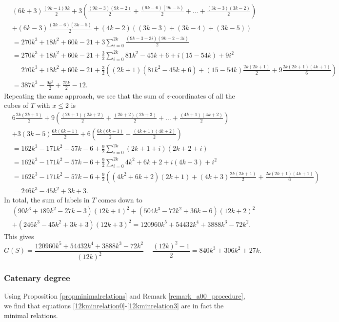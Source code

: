 \documentclass[12pt]{article}
\theoremstyle{remark}
\begin{document}
\begin{align*}
&(6k+3)\frac{(9k-1)9k}{2}   + 3 \left( \frac{(9k-3)(9k-2)}{2}  +  \frac{(9k-6)(9k-5)}{2}  + \dots +   \frac{(3k-3)(3k-2)}{2} \right) \\
& + (6k-3) \frac{(3k-6)(3k-5)}{2}   + (4k-2)( (3k-3) +(3k-4) + (3k-5))\\
& = 270 k^3 + 18 k^2 + 60 k - 21 + 3\sum_{i=0}^{2k} \frac{(9k-3-3i)(9k-2-3i)}{2} \\
& = 270 k^3 + 18 k^2 + 60 k - 21 + \frac{3}{2}\sum_{i=0}^{2k} 81k^2 - 45k+6 + i(15-54k) + 9i^2  \\
&= 270 k^3 + 18 k^2 + 60 k - 21 
+ \frac{3}{2}\left(  (2k+1)(81k^2 - 45k+6) + (15-54k)\frac{2k(2k+1)}{2} + 9 \frac{2k(2k+1)(4k+1)}{6} \right) \\
& = 387 k^3 - \frac{9 k^2}{2} + \frac{75 k}{2} - 12.
\end{align*} \small
Repeating the same approach, we see that the sum of $z$-coordinates of all the cubes of $T$ with $x \leq 2$ is \footnotesize
\begin{align*}
& 6\frac{2k(2k+1)}{2} + 9 \left (\frac{(2k+1)(2k+2)}{2} + \frac{(2k+2)(2k+3)}{2} + \dots +  \frac{(4k+1)(4k+2)}{2} \right)\\
&  + 3(3k-5) \frac{6k(6k+1)}{2}  + 6 \left( \frac{6k(6k+1)}{2} - \frac{(4k+1)(4k+2)}{2}  \right)\\
& = 162 k^3 - 171 k^2 - 57 k - 6 + \frac{9}{2} \sum_{i=0}^{2k} (2k+1+i)(2k+2+i)  \\
& = 162 k^3 - 171 k^2 - 57 k - 6 + \frac{9}{2} \sum_{i=0}^{2k} 4k^2+6k+2 + i(4k+3) + i^2  \\
& = 162 k^3 - 171 k^2 - 57 k - 6 + \frac{9}{2} \left( ( 4k^2+6k+2)(2k+1) + (4k+3) \frac{2k(2k+1)}{2} +  \frac{2k(2k+1)(4k+1)}{6} \right)\\
& = 246k^3 - 45k^2 + 3k+3.
\end{align*} \small
In total, the sum of labels in $T$ comes down to
\begin{align*}
    &(90 k^3 + 189 k^2 - 27 k - 3) (12k+1)^2 + (504 k^3 - 72 k^2 + 36 k - 6)(12k+2)^2 \\
    &+ (246k^3 - 45k^2 + 3k+3) (12k+3)^2  = 120960 k^5 + 54432 k^4 + 3888 k^3 - 72 k^2.
\end{align*}
This gives
$$ G(S) = \frac{120960 k^5 + 54432 k^4 + 3888 k^3 - 72 k^2}{ (12k)^2}  - \frac{(12k)^2-1}{2} = 840 k^3 + 306 k^2 + 27 k .$$

\subsubsection{Catenary degree}
Using Proposition \ref{propminimalrelations} and Remark \ref{remark_a00_procedure}, we find that equations \eqref{12kminrelation0}-\eqref{12kminrelation3} are in fact the minimal relations. 
\end{document}
